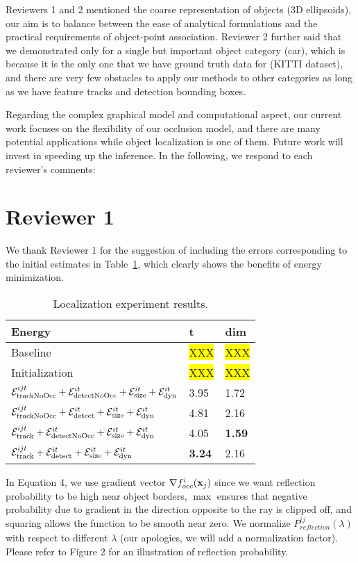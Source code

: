 \documentclass[10pt,twocolumn,letterpaper]{article}
\newcommand{\hili}[1]{\colorbox{yellow}{#1}}
\begin{document}
Reviewers 1 and 2 mentioned the coarse representation of objects (3D ellipsoids), our aim is to balance between the ease of analytical formulations and the practical requirements of object-point association. Reviewer 2 further said that we demonstrated only for a single but important object category (car), which is because it is the only one that we have ground truth data for (KITTI dataset), and there are very few obstacles to apply our methods to other categories as long as we have feature tracks and detection bounding boxes.

Regarding the complex graphical model and computational aspect, our current work focuses on the flexibility of our occlusion model, and there are many potential applications while object localization is one of them. Future work will invest in speeding up the inference. In the following, we respond to each reviewer's comments:

\section{Reviewer 1}

We thank Reviewer 1 for the suggestion of including the errors corresponding to the initial estimates in Table~\ref{tab:localization}, which clearly shows the benefits of energy minimization.   

\begin{table}\centering\footnotesize
\begin{tabular}{|l|l|l|}
\hline
Energy & t & dim \\
\hline
\hline
Baseline & \hili{XXX} & \hili{XXX} \\
Initialization & \hili{XXX} & \hili{XXX} \\
$\mathcal{E}^{ijt}_{\text{trackNoOcc}} + \mathcal{E}^{it}_{\text{detectNoOcc}} +\mathcal{E}^{it}_{\text{size}}+\mathcal{E}^{it}_{\text{dyn}}$ 
& 3.95  & 1.72\\        
$\mathcal{E}^{ijt}_{\text{trackNoOcc}} + \mathcal{E}^{it}_{\text{detect}} +\mathcal{E}^{it}_{\text{size}}+\mathcal{E}^{it}_{\text{dyn}}$        
& 4.81  & 2.16\\        
$\mathcal{E}^{ijt}_{\text{track}} + \mathcal{E}^{it}_{\text{detectNoOcc}} +\mathcal{E}^{it}_{\text{size}}+\mathcal{E}^{it}_{\text{dyn}}$      
& 4.05  & {\bf 1.59}\\        
$\mathcal{E}^{ijt}_{\text{track}} + \mathcal{E}^{it}_{\text{detect}} +\mathcal{E}^{it}_{\text{size}}+\mathcal{E}^{it}_{\text{dyn}}$             
& {\bf 3.24}  & 2.16\\
\hline
\end{tabular}
\caption{Localization experiment results.}
\label{tab:localization}
\end{table}

In Equation 4, we use gradient vector $\nabla {f^i_{occ}}(\mathbf{x}_j)$ since we want reflection probability to be high near object borders, $\max$ ensures that negative probability due to gradient in the direction opposite to the ray is clipped off, and squaring allows the function to be smooth near zero. We normalize $P^{ij}_{\textit{reflection}}(\lambda)$  with respect to different $\lambda$ (our apologies, we will add a normalization factor). Please refer to Figure 2 for an illustration of reflection probability.
\end{document}
